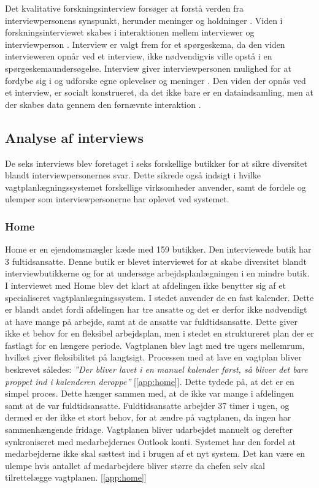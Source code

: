 Det kvalitative forskningsinterview forsøger at forstå verden fra interviewpersonens synspunkt, herunder meninger og holdninger \citep{kvale2009}. Viden i forskningsinterviewet skabes i interaktionen mellem interviewer og interviewperson \citep{kvale2009}. Interview er valgt frem for et spørgeskema, da den viden intervieweren opnår ved et interview, ikke nødvendigvis ville opstå i en spørgeskemaundersøgelse. Interview giver interviewpersonen mulighed for at fordybe sig i og udforske egne oplevelser og meninger \citep{kvale2009}. Den viden der opnås ved et interview, er socialt konstrueret, da det ikke bare er en dataindsamling, men at der skabes data gennem den førnævnte interaktion \citep{kvale2009}.

\subsection{Analyse af interviews}
De seks interviews blev foretaget i seks forskellige butikker for at sikre diversitet blandt interviewpersonernes svar. Dette sikrede også indsigt i hvilke vagtplanlægningssystemet forskellige virksomheder anvender, samt de fordele og ulemper som interviewpersonerne har oplevet ved systemet. 

\subsubsection{Home}
Home er en ejendomsmægler kæde med 159 butikker. Den interviewede butik har 3 fultidsansatte. Denne butik er blevet interviewet for at skabe diversitet blandt interviewbutikkerne og for at undersøge arbejdsplanlægningen i en mindre butik. I interviewet med Home blev det klart at afdelingen ikke benytter sig af  et specialiseret vagtplanlægningssystem. I stedet anvender de en fast kalender. Dette er blandt andet fordi afdelingen har tre ansatte og det er derfor ikke nødvendigt at have mange på arbejde, samt at de ansatte var fuldtidsansatte. Dette giver ikke et behov for en fleksibel arbejdsplan, men i stedet en struktureret plan der er fastlagt for en længere periode. Vagtplanen blev lagt med tre ugers mellemrum, hvilket giver fleksibilitet på langtsigt. Processen med at lave en vagtplan bliver beskrevet således: \textit{”Der bliver lavet i en manuel kalender først, så bliver det bare proppet ind i kalenderen deroppe”} [\ref{app:home}]. Dette tydede på, at det er en simpel proces. Dette hænger sammen med, at de ikke var mange i afdelingen samt at de var fuldtidsansatte. Fuldtidsansatte arbejder 37 timer i ugen, og dermed er der ikke et stort behov, for at ændre på vagtplanen, da ingen har sammenhængende fridage. Vagtplanen bliver udarbejdet manuelt og derefter synkroniseret med medarbejdernes Outlook konti. Systemet har den fordel at medarbejderne ikke skal sættest ind i brugen af et nyt system. Det kan være en ulempe hvis antallet af medarbejdere bliver større da chefen selv skal tilrettelægge vagtplanen. [\ref{app:home}]

